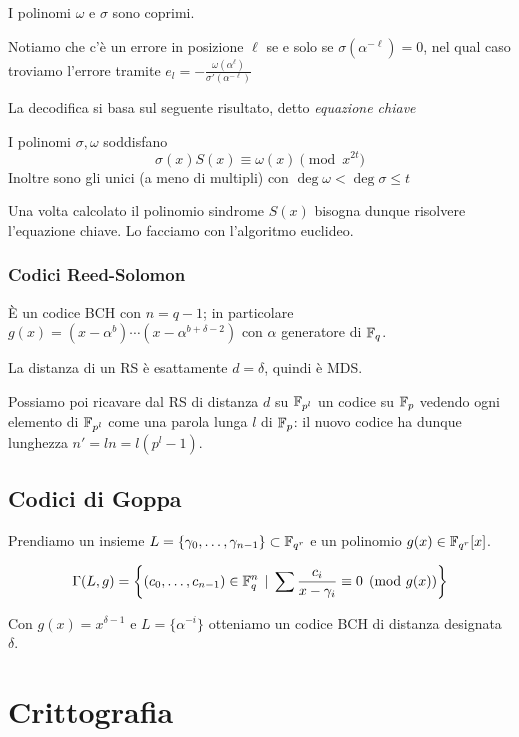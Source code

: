 \documentclass[a4paper]{book}
\begin{document}
    \begin{oss}
        I polinomi $\omega$ e $\sigma$ sono coprimi.
    \end{oss}

    Notiamo che c'è un errore in posizione $\ell$ se e solo se $\sigma(\alpha^{-\ell})=0$, nel qual caso troviamo l'errore tramite $e_l=-\frac{\omega(\alpha^\ell)}{\sigma'(\alpha^{-\ell})}$

    La decodifica si basa sul seguente risultato, detto \emph{equazione chiave}

    \begin{theorem}
        I polinomi $\sigma,\omega$ soddisfano $$\sigma(x)S(x)\equiv\omega(x)\pmod{x^{2t}}$$
        Inoltre sono gli unici (a meno di multipli) con $\deg \omega<\deg \sigma \le t$
    \end{theorem}

    Una volta calcolato il polinomio sindrome $S(x)$ bisogna dunque risolvere l'equazione chiave. Lo facciamo con l'algoritmo euclideo.

    \subsection{Codici Reed-Solomon}
    È un codice BCH con $n=q-1$; in particolare $g(x)=(x-\alpha^{b})\cdots(x-\alpha^{b+\delta-2})$ con $\alpha$ generatore di $\mathbb{F}_q$.

    \begin{oss}
        La distanza di un RS è esattamente $d=\delta$, quindi è MDS.
    \end{oss}

    Possiamo poi ricavare dal RS di distanza $d$ su $\mathbb{F}_{p^l}$ un codice su $\mathbb{F}_p$ vedendo ogni elemento di $\mathbb{F}_{p^l}$ come una parola lunga $l$ di $\mathbb{F}_p$: il nuovo codice ha dunque lunghezza $n'=ln=l(p^l-1)$.

    \section{Codici di Goppa}
    \begin{definition}
        Prendiamo un insieme $L=\{ \gamma_0,\dots,\gamma_{n-1} \}\subset \mathbb{F}_{q^r}$ e un polinomio $g(x)\in\mathbb{F}_{q^r}[x]$.

        $$\Gamma(L,g)=\left\{ (c_0,\dots,c_{n-1})\in\mathbb{F}_q^n\operatorname{\; |\;} \sum\frac{c_i}{x-\gamma_i}\equiv0\pmod{g(x)} \right\}$$
    \end{definition}

    \begin{oss}
        Con $g(x)=x^{\delta-1}$ e $L=\{ \alpha^{-i} \}$ otteniamo un codice BCH di distanza designata $\delta$.
    \end{oss}




    \chapter{Crittografia}
\end{document}
